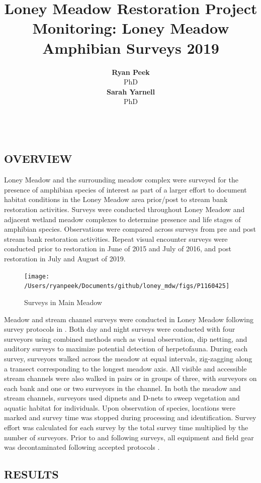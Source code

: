 \documentclass[11pt,a4paper,]{article}
\title{Loney Meadow Restoration Project Monitoring: Loney Meadow Amphibian Surveys 2019}
\author{\sf\Large\textbf{ Ryan Peek}\\ {\sf\large PhD\\[0.5cm]} \sf\Large\textbf{ Sarah Yarnell}\\ {\sf\large PhD\\[0.5cm]}}
\date{\sf\Date~\Month~\Year}
\makeatletter
\def\titlepage{\front{\expandafter{\@title}}{\@author}{\@organization}}
\makeatother
\begin{document}
\titlepage

\hypertarget{overview}{%
\subsection{OVERVIEW}\label{overview}}

Loney Meadow and the surrounding meadow complex were surveyed for the presence of amphibian species of interest as part of a larger effort to document habitat conditions in the Loney Meadow area prior/post to stream bank restoration activities. Surveys were conducted throughout Loney Meadow and adjacent wetland meadow complexes to determine presence and life stages of amphibian species. Observations were compared across surveys from pre and post stream bank restoration activities. Repeat visual encounter surveys were conducted prior to restoration in June of 2015 and July of 2016, and post restoration in July and August of 2019.

\begin{figure}

{\centering \texttt{[image: /Users/ryanpeek/Documents/github/loney\_mdw/figs/P1160425]} 

}

\caption{Surveys in Main Meadow}\label{fig:fig1}
\end{figure}

Meadow and stream channel surveys were conducted in Loney Meadow following survey protocols in \textcite{Heyer1994-dr}. Both day and night surveys were conducted with four surveyors using combined methods such as visual observation, dip netting, and auditory surveys to maximize potential detection of herpetofauna. During each survey, surveyors walked across the meadow at equal intervals, zig-zagging along a transect corresponding to the longest meadow axis. All visible and accessible stream channels were also walked in pairs or in groups of three, with surveyors on each bank and one or two surveyors in the channel. In both the meadow and stream channels, surveyors used dipnets and D-nets to sweep vegetation and aquatic habitat for individuals. Upon observation of species, locations were marked and survey time was stopped during processing and identification. Survey effort was calculated for each survey by the total survey time multiplied by the number of surveyors. Prior to and following surveys, all equipment and field gear was decontaminated following accepted protocols \autocite{Daszak2001-in,Johnson2003-yc,Phillott2010-mt}.

\hypertarget{results}{%
\subsection{RESULTS}\label{results}}
\end{document}
